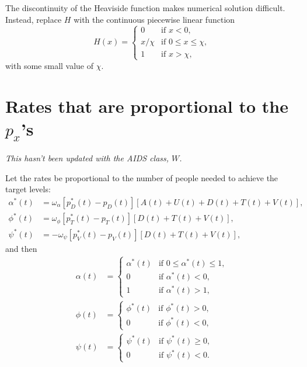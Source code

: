 \documentclass{article}
\begin{document}
The discontinuity of the Heaviside function makes numerical solution
difficult.  Instead, replace $H$ with the continuous piecewise linear
function
\begin{equation}
  H(x) =
  \begin{cases}
    0 & \text{if $x < 0$},
    \\
    x / \chi & \text{if $0 \leq x \leq \chi$},
    \\
    1 & \text{if $x > \chi$},
  \end{cases}
\end{equation}
with some small value of $\chi$.


\section{Rates that are proportional to the $p_x$'s}

\textit{This hasn't been updated with the AIDS class, $W$.}

Let the rates be proportional to the number of people needed to
achieve the target levels:
\begin{equation}
  \begin{split}
    \alpha^*(t) &= \omega_{\alpha}
    [p_D^*(t) - p_D(t)]
    [A(t) + U(t) + D(t) + T(t) + V(t)],
    \\
    \phi^*(t) &= \omega_{\phi}
    [p_T^*(t) - p_T(t)]
    [D(t) + T(t) + V(t)],
    \\
    \psi^*(t) &= - \omega_{\psi}
    [p_V^*(t) - p_V(t)]
    [D(t) + T(t) + V(t)],
  \end{split}
\end{equation}
and then
\begin{equation}
  \begin{split}
    \alpha(t) &=
    \begin{cases}
      \alpha^*(t) & \text{if $0 \leq \alpha^*(t) \leq 1$},
      \\
      0 & \text{if $\alpha^*(t) < 0$},
      \\
      1 & \text{if $\alpha^*(t) > 1$},
    \end{cases}
    \\
    \phi(t) &=
    \begin{cases}
      \phi^*(t) & \text{if $\phi^*(t) > 0$},
      \\
      0 & \text{if $\phi^*(t) < 0$},
    \end{cases}
    \\
    \psi(t) &=
    \begin{cases}
      \psi^*(t) & \text{if $\psi^*(t) \geq 0$},
      \\
      0 & \text{if $\psi^*(t) < 0$}.
    \end{cases}
  \end{split}
\end{equation}
\end{document}
